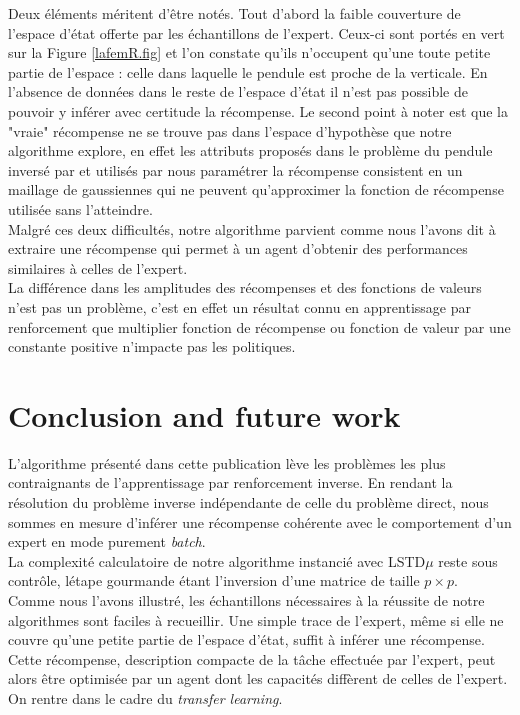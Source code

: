 \documentclass[publibook-draft]{CAp2012}
\begin{document}
Deux éléments méritent d'être notés. Tout d'abord la faible couverture de l'espace d'état offerte par les échantillons de l'expert. Ceux-ci sont portés en vert sur la Figure \ref{lafemR.fig} et l'on constate qu'ils n'occupent qu'une toute petite partie de l'espace : celle dans laquelle le pendule est proche de la verticale. En l'absence de données dans le reste de l'espace d'état il n'est pas possible de pouvoir y inférer avec certitude la récompense. Le second point à noter est que la "vraie" récompense ne se trouve pas dans l'espace d'hypothèse que notre algorithme explore, en effet les attributs proposés dans le problème du pendule inversé par \citet{lagoudakis2003least} et utilisés par nous paramétrer la récompense consistent en un maillage de gaussiennes qui ne peuvent qu'approximer la fonction de récompense utilisée sans l'atteindre.\\

Malgré ces deux difficultés, notre algorithme parvient comme nous l'avons dit à extraire une récompense qui permet à un agent d'obtenir des performances similaires à celles de l'expert.\\

La différence dans les amplitudes des récompenses et des fonctions de valeurs n'est pas un problème, c'est en effet un résultat connu en apprentissage par renforcement que multiplier fonction de récompense ou fonction de valeur par une constante positive n'impacte pas les politiques.
\section{Conclusion and future work}

L'algorithme présenté dans cette publication lève les problèmes les plus contraignants de l'apprentissage par renforcement inverse. En rendant la résolution du problème inverse indépendante de celle du problème direct, nous sommes en mesure d'inférer une récompense cohérente avec le comportement d'un expert en mode purement \emph{batch}.\\

La complexité calculatoire de notre algorithme instancié avec LSTD$\mu$ reste sous contrôle, létape gourmande étant l'inversion d'une matrice de taille $p \times p$.\\

Comme nous l'avons illustré, les échantillons nécessaires à la réussite de notre algorithmes sont faciles à recueillir. Une simple trace de l'expert, même si elle ne couvre qu'une petite partie de l'espace d'état, suffit à inférer une récompense. Cette récompense, description compacte de la tâche effectuée par l'expert, peut alors être optimisée par un agent dont les capacités diffèrent de celles de l'expert. On rentre dans le cadre du \emph{transfer learning}.\\
\end{document}

